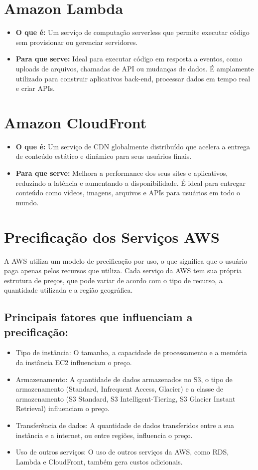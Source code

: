 \documentclass[a4paper,12pt]{article}
\begin{document}
\section*{Amazon Lambda}
\begin{itemize}[left=0pt]
    \item \textbf{O que é:} Um serviço de computação serverless que permite executar código sem provisionar ou gerenciar servidores.
    \item \textbf{Para que serve:} Ideal para executar código em resposta a eventos, como uploads de arquivos, chamadas de API ou mudanças de dados. É amplamente utilizado para construir aplicativos back-end, processar dados em tempo real e criar APIs.
\end{itemize}

\section*{Amazon CloudFront}
\begin{itemize}[left=0pt]
    \item \textbf{O que é:} Um serviço de CDN globalmente distribuído que acelera a entrega de conteúdo estático e dinâmico para seus usuários finais.
    \item \textbf{Para que serve:} Melhora a performance dos seus sites e aplicativos, reduzindo a latência e aumentando a disponibilidade. É ideal para entregar conteúdo como vídeos, imagens, arquivos e APIs para usuários em todo o mundo.
\end{itemize}

\section*{Precificação dos Serviços AWS}
A AWS utiliza um modelo de precificação por uso, o que significa que o usuário paga apenas pelos recursos que utiliza. Cada serviço da AWS tem sua própria estrutura de preços, que pode variar de acordo com o tipo de recurso, a quantidade utilizada e a região geográfica.

\subsection*{Principais fatores que influenciam a precificação:}
\begin{itemize}[left=0pt]
    \item Tipo de instância: O tamanho, a capacidade de processamento e a memória da instância EC2 influenciam o preço.
    \item Armazenamento: A quantidade de dados armazenados no S3, o tipo de armazenamento (Standard, Infrequent Access, Glacier) e a classe de armazenamento (S3 Standard, S3 Intelligent-Tiering, S3 Glacier Instant Retrieval) influenciam o preço.
    \item Transferência de dados: A quantidade de dados transferidos entre a sua instância e a internet, ou entre regiões, influencia o preço.
    \item Uso de outros serviços: O uso de outros serviços da AWS, como RDS, Lambda e CloudFront, também gera custos adicionais.
\end{itemize}
\end{document}
